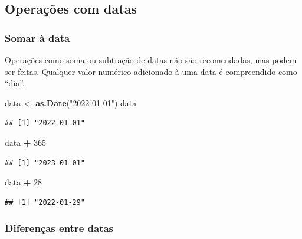 \documentclass[
]{book}
\newenvironment{Shaded}{\begin{snugshade}}{\end{snugshade}}
\newcommand{\DecValTok}[1]{\textcolor[rgb]{0.00,0.00,0.81}{#1}}
\newcommand{\FunctionTok}[1]{\textcolor[rgb]{0.13,0.29,0.53}{\textbf{#1}}}
\newcommand{\NormalTok}[1]{#1}
\newcommand{\OtherTok}[1]{\textcolor[rgb]{0.56,0.35,0.01}{#1}}
\newcommand{\SpecialCharTok}[1]{\textcolor[rgb]{0.81,0.36,0.00}{\textbf{#1}}}
\newcommand{\StringTok}[1]{\textcolor[rgb]{0.31,0.60,0.02}{#1}}
\theoremstyle{definition}
\theoremstyle{definition}
\theoremstyle{definition}
\theoremstyle{definition}
\theoremstyle{remark}
\begin{document}
\hypertarget{operauxe7uxf5es-com-datas}{%
\subsection{Operações com datas}\label{operauxe7uxf5es-com-datas}}

\hypertarget{somar-uxe0-data}{%
\subsubsection{Somar à data}\label{somar-uxe0-data}}

Operações como soma ou subtração de datas não são recomendadas, mas podem ser feitas. Qualquer valor numérico adicionado à uma data é compreendido como ``dia''.

\begin{Shaded}
\begin{Highlighting}[]
\NormalTok{data }\OtherTok{\textless{}{-}} \FunctionTok{as.Date}\NormalTok{(}\StringTok{"2022{-}01{-}01"}\NormalTok{)}
\NormalTok{data}
\end{Highlighting}
\end{Shaded}

\begin{verbatim}
## [1] "2022-01-01"
\end{verbatim}

\begin{Shaded}
\begin{Highlighting}[]
\NormalTok{data }\SpecialCharTok{+} \DecValTok{365}
\end{Highlighting}
\end{Shaded}

\begin{verbatim}
## [1] "2023-01-01"
\end{verbatim}

\begin{Shaded}
\begin{Highlighting}[]
\NormalTok{data }\SpecialCharTok{+} \DecValTok{28}
\end{Highlighting}
\end{Shaded}

\begin{verbatim}
## [1] "2022-01-29"
\end{verbatim}

\hypertarget{diferenuxe7as-entre-datas}{%
\subsubsection{Diferenças entre datas}\label{diferenuxe7as-entre-datas}}
\end{document}
